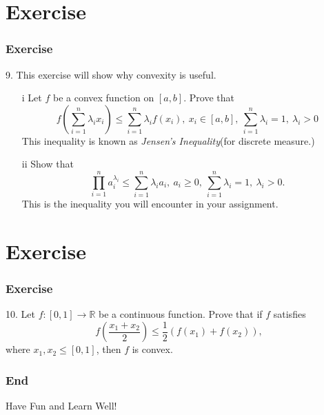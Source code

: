 \documentclass[12pt, t]{beamer}
\renewcommand{\emph}[1]{{\color{Turquoise3}\textsl{#1}}}
\begin{document}
\section{Exercise}
\begin{frame}
    \frametitle{Exercise}
    9. This exercise will show why convexity is useful.
    \begin{enumerate}
        \item[i]    Let $f$ be a convex function on $[a,b]$. Prove that
            \begin{equation*}
                f\left(\sum^n_{i=1}\lambda_i x_i\right)\leq \sum^n_{i=1}\lambda_i f(x_i),\ x_i\in[a,b],\ \sum^n_{i=1}\lambda_i=1,\ \lambda_i>0
            \end{equation*}
            This inequality is known as \emph{Jensen's Inequality}(for discrete measure.)
        \item[ii] Show that
            \begin{equation*}
                \prod^n_{i=1} a_i^{\lambda_i}\leq \sum^n_{i=1}\lambda_i a_i,\ a_i\geq 0,\ \sum^n_{i=1}\lambda_i=1,\ \lambda_i>0.
            \end{equation*}
            This is the inequality you will encounter in your assignment.
    \end{enumerate}
\end{frame}

\section{Exercise}
\begin{frame}
    \frametitle{Exercise}
    10. Let $f\colon [0,1]\rightarrow\mathbb{R}$ be a continuous function. Prove that if $f$ satisfies
    \begin{equation*}
        f\left(\frac{x_1+x_2}{2}\right)\leq \frac{1}{2}(f(x_1)+f(x_2)),
    \end{equation*}
    where $x_1,x_2\leq[0,1]$, then $f$ is convex.
\end{frame}

\begin{frame}
    \frametitle{End}
    \vspace{2cm}
    \Huge \center  Have Fun and Learn Well!
\end{frame}
\end{document}
